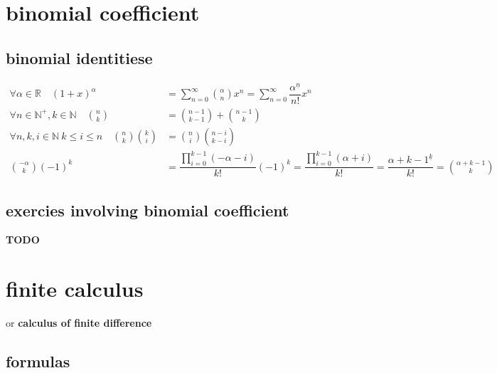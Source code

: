 \documentclass{article}
\newcommand{\N}{\mathbb{N}}
\begin{document}
\section{binomial coefficient}

\subsection{binomial identitiese}

\[
	\begin{aligned}
		\forall \alpha\in \mathbb{R}\quad
		{(1+x)}^{\alpha}
		                         & =\sum_{n=0}^\infty \binom{\alpha}{n}x^n=\sum_{n=0}^\infty \dfrac{\alpha^{\underline n}}{n!} x^n \\
		\forall n\in \N^+, k\in \N\quad \binom{n}{k}
		                         & = \binom{n-1}{k-1}+\binom{n-1}{k}                                                               \\
		\forall n,k,i\in \N\ k\leq i\leq n\quad
		\binom{n}{k}\binom{k}{i} & = \binom{n}{i}\binom{n-i}{k-i}                                                                  \\
		\binom{-\alpha}{k}{(-1)}^k
		                         & =\dfrac{\prod_{i=0}^{k-1}(-\alpha-i)}{k!}{(-1)}^k
		=\dfrac{\prod_{i=0}^{k-1}(\alpha+i)}{k!}
		=\dfrac{{\alpha+k-1}^{\underline k}}{k!}
		=\binom{\alpha+k-1}{k}
	\end{aligned}
\]

\subsection{exercies involving binomial coefficient}
\textbf{TODO} 
\newpage

\section{finite calculus}

or \textbf{calculus of finite difference}

\subsection{formulas}
\end{document}
